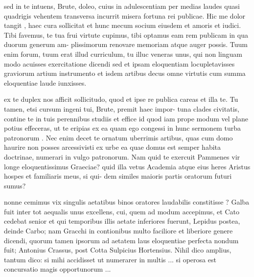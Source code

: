  sed in te intuens, Brute, doleo, cuius in adulescentiam per medias laudes quasi quadrigis vehentem transversa incurrit misera fortuna rei publicae. Hic me dolor tangit , haec cura sollicitat et hunc mecum socium eiusdem et amoris et iudici. Tibi favemus, te tua frui virtute cupimus, tibi optamus eam rem publicam in qua duorum generum am- plissimorum renovare memoriam atque auger possis. Tuum enim forum, tuum erat illud curriculum, tu illuc veneras unus, qui non linguam modo acuisses exercitatione dicendi sed et ipsam eloquentiam locupletavisses graviorum artium instrumento et isdem artibus decus omne virtutis cum summa eloquentiae laude iunxisses.

 ex te duplex nos afficit sollicitudo, quod et ipse re publica careas et illa te. Tu tamen, etsi cursum ingeni tui, Brute, premit haec impor- tuna clades civitatis, contine te in tuis perennibus studiis et effice id quod iam prope modum vel plane potius effeceras, ut te eripias ex ea quam ego congessi in hunc sermonem turba patronorum . Nec enim decet te ornatum uberrimis artibus, quas cum domo haurire non posses arcessivisti ex urbe ea quae domus est semper habita doctrinae, numerari in vulgo patronorum. Nam quid te exercuit Pammenes vir longe eloquentissimus Graeciae? quid illa vetus Academia atque eius heres Aristus hospes et familiaris meus, si qui- dem similes maioris partis oratorum futuri sumus?

 nonne cemimus vix singulis aetatibus binos oratores laudabilis constitisse ? Galba fuit inter tot aequalis unus excellens, cui, quem ad modum accepimus, et Cato cedebat senior et qui temporibus illis aetate inferiores fuerunt, Lepidus postea, deinde Carbo; nam Gracchi in contionibus multo faciliore et liberiore genere dicendi, quorum tamen ipsorum ad aetatem laus eloquentiae perfecta nondum fuit; Antonius Crassus, post Cotta Sulpicius Hortensius. Nihil dico amplius, tantum dico: si mihi accidisset ut numerarer in multis ... si operosa est concursatio magis opportunorum ...
